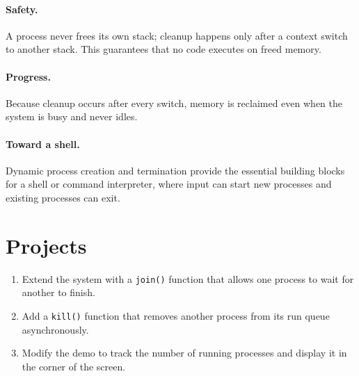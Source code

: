 \paragraph{Safety.}
A process never frees its own stack; cleanup happens only after a context switch
to another stack.  This guarantees that no code executes on freed memory.

\paragraph{Progress.}
Because cleanup occurs after every switch, memory is reclaimed even when the
system is busy and never idles.

\paragraph{Toward a shell.}
Dynamic process creation and termination provide the essential building blocks
for a shell or command interpreter, where input can start new processes and
existing processes can exit.

\section*{Projects}

\begin{enumerate}
  \item Extend the system with a \texttt{join()} function that allows one
        process to wait for another to finish.
  \item Add a \texttt{kill()} function that removes another process from its
        run queue asynchronously.
  \item Modify the demo to track the number of running processes and display it
        in the corner of the screen.
\end{enumerate}
